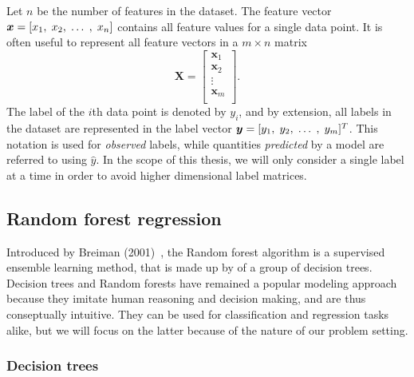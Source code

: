 \documentclass[english, 12pt, a4paper, sci, utf8, a-2b, online]{aaltothesis}
\begin{document}
Let $n$ be the number of features in the dataset. The feature vector \\ $\bm{x} = [x_1,\hspace{1mm} x_2,\hspace{1mm} \ldots\hspace{1mm},\hspace{1mm} x_n]$ contains
all feature values for a single data point. It is often useful to represent all feature vectors in a $m \times n$ matrix
%
\begin{equation*}
  \mathbf{X}=
  \begin{bmatrix}
    \bm{x}_1 \\
    \bm{x}_2 \\
    \vdots   \\
    \bm{x}_m \\
  \end{bmatrix}.
\end{equation*}
%
The label of the $i$th data point is denoted by $y_i$, and by extension, all labels in the dataset are represented in the label vector
$\bm{y} = [y_1,\hspace{1mm} y_2,\hspace{1mm} \ldots\hspace{1mm},\hspace{1mm} y_m]^T$. This notation is used for \textit{observed} labels, while quantities \textit{predicted} by a model are referred
to using $\hat{y}$. In the scope of this thesis, we will only consider a single label at a time in order to avoid higher dimensional label matrices.

\subsection{Random forest regression}

Introduced by Breiman (2001)~\cite{breiman}, the Random forest algorithm is a supervised ensemble learning method, that is made up by of a group of decision trees. Decision trees and Random forests have
remained a popular modeling approach because they imitate human reasoning and decision making, and are thus conseptually intuitive. They can be used for classification and regression tasks alike,
but we will focus on the latter because of the nature of our problem setting.

\subsubsection{Decision trees}
\end{document}

